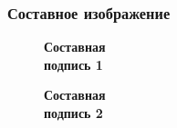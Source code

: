 \documentclass[14pt]{beamer}
\begin{document}
\begin{frame}
\frametitle{Составное изображение}
\begin{figure}[h]
  \begin{minipage}[h]{0.49\linewidth}
    \textbf{Составная \\ подпись 1}
  \end{minipage}
  \hfill
  \begin{minipage}[h]{0.49\linewidth}
    \textbf{Составная \\ подпись 2}

\end{minipage}
\end{figure}
\end{frame}
\end{document}
